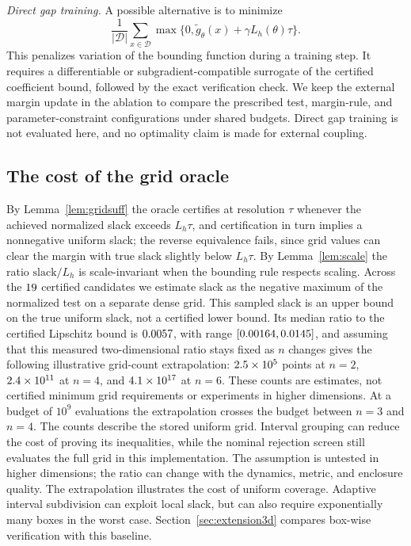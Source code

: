 \documentclass[12pt,onecolumn,journal]{IEEEtran}
\newcommand{\D}{\mathcal{D}}
\begin{document}
\noindent\textit{Direct gap training.} A possible alternative is to minimize
\[
\frac1{|\D|}\sum_{x\in\D}\max\{0,\tilde g_\theta(x)+\gamma L_h(\theta)\tau\}.
\]
This penalizes variation of the bounding function during a training step. It requires a differentiable or subgradient-compatible surrogate of the certified coefficient bound, followed by the exact verification check. We keep the external margin update in the ablation to compare the prescribed test, margin-rule, and parameter-constraint configurations under shared budgets. Direct gap training is not evaluated here, and no optimality claim is made for external coupling.

\subsection{The cost of the grid oracle}

By Lemma~\ref{lem:gridsuff} the oracle certifies at resolution $\tau$ whenever the achieved normalized slack exceeds $L_h \tau$, and certification in turn implies a nonnegative uniform slack; the reverse equivalence fails, since grid values can clear the margin with true slack slightly below $L_h\tau$. By Lemma~\ref{lem:scale} the ratio $\mathrm{slack}/L_h$ is scale-invariant when the bounding rule respects scaling. Across the $19$ certified candidates we estimate slack as the negative maximum of the normalized test on a separate dense grid. This sampled slack is an upper bound on the true uniform slack, not a certified lower bound. Its median ratio to the certified Lipschitz bound is $0.0057$, with range $[0.00164, 0.0145]$, and assuming that this measured two-dimensional ratio stays fixed as $n$ changes gives the following illustrative grid-count extrapolation: $2.5 \times 10^{5}$ points at $n = 2$, $2.4 \times 10^{11}$ at $n = 4$, and $4.1 \times 10^{17}$ at $n = 6$. These counts are estimates, not certified minimum grid requirements or experiments in higher dimensions. At a budget of $10^9$ evaluations the extrapolation crosses the budget between $n = 3$ and $n = 4$. The counts describe the stored uniform grid. Interval grouping can reduce the cost of proving its inequalities, while the nominal rejection screen still evaluates the full grid in this implementation. The assumption is untested in higher dimensions; the ratio can change with the dynamics, metric, and enclosure quality. The extrapolation illustrates the cost of uniform coverage. Adaptive interval subdivision can exploit local slack, but can also require exponentially many boxes in the worst case. Section~\ref{sec:extension3d} compares box-wise verification with this baseline.
\end{document}
